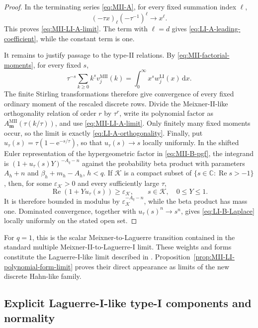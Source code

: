 \documentclass[10pt]{amsart}
\newcommand{\e}{\mathrm e}
\newcommand{\dd}{\,\mathrm d}
\newcommand{\mm}{\boldsymbol m}
\newcommand{\fall}[2]{#1^{\underline{#2}}}
\theoremstyle{plain}
\theoremstyle{definition}
\theoremstyle{remark}
\begin{document}
\begin{proof}
In the terminating series \eqref{eq:MII-A}, for every fixed summation
index \(\ell\),
\[
 (-\tau x)_\ell(-\tau^{-1})^\ell\longrightarrow x^\ell.
\]
This proves \eqref{eq:MII-LI-A-limit}. The term with \(\ell=d\) gives
\eqref{eq:LI-A-leading-coefficient}, while the constant term is one.

It remains to justify passage to the type-II relations. By
\eqref{eq:MII-factorial-moments}, for every fixed \(s\),
\[
 \tau^{-s}\sum_{k\ge0}\fall{k}{s}v_j^{\mathrm{MII}}(k)
 =\int_0^\infty x^s w_j^{\mathrm{LI}}(x)\dd x.
\]
The finite Stirling transformations therefore give convergence of every
fixed ordinary moment of the rescaled discrete rows. Divide the
Meixner-II-like orthogonality relation of order \(r\) by \(\tau^r\),
write its polynomial factor as
\(A_{\mm}^{\mathrm{MII}}(\tau(k/\tau))\), and use
\eqref{eq:MII-LI-A-limit}. Only finitely many fixed moments occur, so the
limit is exactly \eqref{eq:LI-A-orthogonality}. Finally,
put \(u_\tau(s)=\tau(1-\e^{-s/\tau})\), so that
\(u_\tau(s)\to s\) locally uniformly. In the shifted Euler representation
of the hypergeometric factor in \eqref{eq:MII-B-pgf}, the integrand is
\((1+u_\tau(s)Y)^{-A_q-n}\) against the probability beta product with
parameters \(A_h+n\) and \(\beta_h+m_h-A_h\), \(h<q\).
If \(\mathcal K\) is a compact subset of
\(\{s\in\mathbb C:\operatorname{Re}s>-1\}\), then, for some
\(\varepsilon_{\mathcal K}>0\) and every sufficiently large \(\tau\),
\[
 \operatorname{Re}(1+Yu_\tau(s))\ge\varepsilon_{\mathcal K},
 \qquad s\in\mathcal K,\quad 0\le Y\le1.
\]
It is therefore bounded in modulus by
\(\varepsilon_{\mathcal K}^{-A_q-n}\), while the beta product has mass one.
Dominated convergence, together with \(u_\tau(s)^n\to s^n\), gives
\eqref{eq:LI-B-Laplace} locally uniformly on the stated open set.
\end{proof}

For \(q=1\), this is the scalar Meixner-to-Laguerre transition contained in
the standard multiple Meixner-II-to-Laguerre-I limit.
These weights and forms constitute the Laguerre-I-like limit described in
\cite[Section~3]{Wolfs2024}. Proposition~\ref{prop:MII-LI-polynomial-form-limit}
proves their direct appearance as limits of the new discrete Hahn-like
family.


\subsection{Explicit Laguerre-I-like type-I components and normality}
\end{document}

